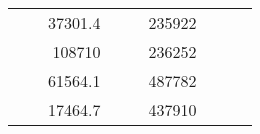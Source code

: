 \begin{table}[H]
\begin{tabular}{|ccrccrccc}
\multicolumn{1}{|c|}{\cellcolor[HTML]{FFFFC7}}                                & \multicolumn{1}{c|}{\cellcolor[HTML]{DAE8FC}}                      & \multicolumn{1}{r|}{\cellcolor[HTML]{DAE8FC}37301.4}   & \multicolumn{1}{c|}{\cellcolor[HTML]{FFFFC7}}                                & \multicolumn{1}{c|}{\cellcolor[HTML]{DAE8FC}}                       & \multicolumn{1}{r|}{\cellcolor[HTML]{DDFDFF}235922}    &                                                                              &                                                                    &                                                        \\ \cline{3-3} \cline{6-6}
\multicolumn{1}{|c|}{\cellcolor[HTML]{FFFFC7}}                                & \multicolumn{1}{c|}{\cellcolor[HTML]{DAE8FC}}                      & \multicolumn{1}{r|}{\cellcolor[HTML]{DDFDFF}108710}    & \multicolumn{1}{c|}{\cellcolor[HTML]{FFFFC7}}                                & \multicolumn{1}{c|}{\cellcolor[HTML]{DAE8FC}}                       & \multicolumn{1}{r|}{\cellcolor[HTML]{DAE8FC}236252}    &                                                                              &                                                                    &                                                        \\ \cline{3-3} \cline{6-6}
\multicolumn{1}{|c|}{\cellcolor[HTML]{FFFFC7}}                                & \multicolumn{1}{c|}{\cellcolor[HTML]{DAE8FC}}                      & \multicolumn{1}{r|}{\cellcolor[HTML]{DAE8FC}61564.1}   & \multicolumn{1}{c|}{\cellcolor[HTML]{FFFFC7}}                                & \multicolumn{1}{c|}{\cellcolor[HTML]{DAE8FC}}                       & \multicolumn{1}{r|}{\cellcolor[HTML]{DDFDFF}487782}    &                                                                              &                                                                    &                                                        \\ \cline{3-3} \cline{6-6}
\multicolumn{1}{|c|}{\cellcolor[HTML]{FFFFC7}}                                & \multicolumn{1}{c|}{\cellcolor[HTML]{DAE8FC}}                      & \multicolumn{1}{r|}{\cellcolor[HTML]{DDFDFF}17464.7}   & \multicolumn{1}{c|}{\cellcolor[HTML]{FFFFC7}}                                & \multicolumn{1}{c|}{\cellcolor[HTML]{DAE8FC}}                       & \multicolumn{1}{r|}{\cellcolor[HTML]{DAE8FC}437910}    &                                                                              &                                                                    &                                                        \\ \cline{3-3} \cline{6-6}

\end{tabular}
\end{table}
